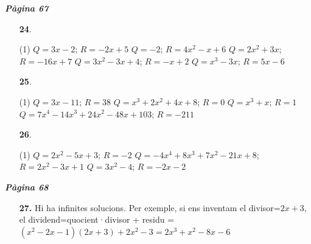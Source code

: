 \documentclass[a4paper, pdf, twoside]{book}
\begin{document}
\begin{multicols}{2}

{\textbf{\em Pàgina 67}} \hrulefill
\begin{enumerate}
\vspace{0.25cm}



 \item[\fontfamily{phv}\selectfont\color{blue}\textbf{24}. ]  \scalebox{0.6}{\simbolclau } 
 \begin{tasks}[column-sep=1em, item-indent=1.3333em](1)
	 \task $Q=3x-2$; $R=-2x+5$
	 \task $Q=-2$; $R=4x^2-x+6$
	 \task $Q=2x^2+3x$; $R=-16x+7$
	 \task $Q=3x^2-3x+4$; $R=-x+2$
	 \task $Q=x^3-3x$; $R=5x-6$
\end{tasks}
 \end{enumerate}
\begin{enumerate}
\vspace{0.25cm}



 \item[\fontfamily{phv}\selectfont\color{blue}\textbf{25}. ]  \scalebox{0.6}{\simbolclau } 
 \begin{tasks}[column-sep=1em, item-indent=1.3333em](1)
	 \task $Q=3x-11$; $R=38$
	 \task $Q=x^3+2x^2+4x+8$; $R=0$
	 \task $Q=x^3+x$; $R=1$
	 \task* $Q=7x^4-14x^3+24x^2-48x+103$; $R=-211$
\end{tasks}
\vspace{0.25cm}



 \item[\fontfamily{phv}\selectfont\color{blue}\textbf{26}. ] 
 \begin{tasks}[column-sep=1em, item-indent=1.3333em](1)
	 \task $Q=2x^2-5x+3$; $R=-2$
	 \task* $Q=-4x^4+8x^3+7x^2-21x+8$; $R=2x^2-3x+1$
	 \task $Q=3x^2-4$; $R=-2x-2$
\end{tasks}
 \end{enumerate}
\vspace{0.3cm}


{\textbf{\em Pàgina 68}} \hrulefill
\begin{enumerate}
\vspace{0.25cm}
\item[\fontfamily{phv}\selectfont\color{blue}\textbf{27. }] 
Hi ha infinites solucions. Per exemple, si ens inventam el divisor=$2x+3$, el dividend=quocient·divisor + residu = $(x^2-2x-1)(2x+3)+2x^2-3=2x^3+x^2-8x-6$
 \end{enumerate}
\begin{enumerate}
\vspace{0.25cm}



\end{enumerate}
\end{multicols}
\end{document}
